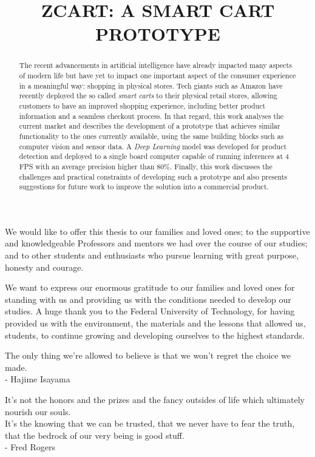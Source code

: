 \documentclass[openright]{normas-utf-tex} %
\title{\MakeUppercase{zCart: A smart cart prototype}} %
\begin{document}
\capa %
\folhaderosto %



\begin{dedicatoria}
We would like to offer this thesis to our families and loved ones;
to the supportive and knowledgeable Professors and mentors we had
over the course of our studies; and to other students and enthusiasts
who pursue learning with great purpose, honesty and courage.
\end{dedicatoria}

\begin{agradecimentos}
We want to express our enormous gratitude to our families and loved ones 
for standing with us and providing us with the conditions needed to develop our studies.
A huge thank you to the Federal University of Technology, for having
provided us with the environment, the materials and the lessons	that allowed us,
students, to continue growing and developing ourselves to the highest standards.
\end{agradecimentos}

\begin{epigrafe}
 The only thing we're allowed to believe is that we won't regret the choice we made.  \\
- Hajime Isayama

It's not the honors and the prizes and the fancy outsides of life which ultimately nourish our souls. \\
It's the knowing that we can be trusted, that we never have to fear the truth, that the bedrock of our very being is good stuff.\\
- Fred Rogers
\end{epigrafe}

\begin{abstract}
The recent advancements in artificial intelligence have already impacted many
aspects of modern life but have yet to impact one important aspect of the
consumer experience in a meaningful way: shopping in physical stores. Tech
giants such as Amazon have recently deployed the so called \textit{smart
carts} to their physical retail stores, allowing customers to have an
improved shopping experience, including better product information and a
seamless checkout process. In that regard, this work analyses the current
market and describes the development of a prototype that achieves similar
functionality to the ones currently available, using the same building
blocks such as computer vision and sensor data. A \textit{Deep Learning}
model was developed for product detection and deployed to a single board
computer capable of running inferences at 4 FPS with an average precision 
higher than  80\%. Finally, this work discusses the challenges and
practical constraints of developing such a prototype and also presents 
suggestions for future work to improve the solution into a commercial 
product.
\end{abstract}
\end{document}
